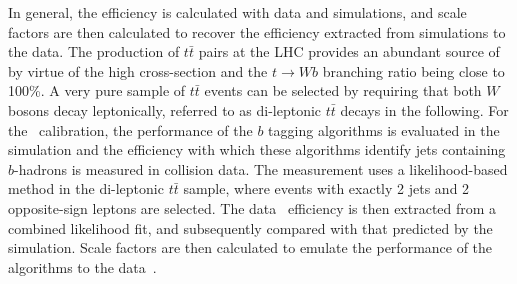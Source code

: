 \documentclass[letterpaper,12pt]{article}
\begin{document}
In general, the efficiency is calculated with data and simulations, 
and scale factors are then calculated to recover the efficiency extracted 
from simulations to the data.
The production of $t\bar{t}$ 
pairs at the LHC provides an abundant source of \bjets by virtue 
of the high cross-section and the $t \rightarrow Wb$ branching ratio 
being close to 100\%. A very pure sample of $t\bar{t}$ events can be 
selected by requiring that both $W$ bosons decay leptonically, 
referred to as di-leptonic $t\bar{t}$ decays in the following.
For the \bjet\ calibration, the performance of the $b$ tagging 
algorithms is evaluated in the simulation and the efficiency 
with which these algorithms identify jets containing $b$-hadrons 
is measured in collision data. The measurement uses a likelihood-based 
method in the di-leptonic $t\bar{t}$ sample, where
events with exactly 2 jets and 2 opposite-sign leptons are selected.  
The data \bjet\ efficiency is 
then extracted from a combined likelihood fit, and subsequently 
compared with that predicted by the simulation. Scale factors are 
then calculated to emulate the performance of the algorithms to the data~\cite{FTAG-2018-01}.
\end{document}
